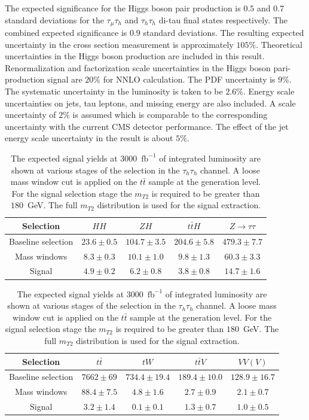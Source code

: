 The expected significance for the Higgs boson pair production is $0.5$ and $0.7$ standard deviations for the $\tau_{\mu}\tau_{h}$ and $\tau_{h}\tau_{h}$ di-tau final states respectively. The combined expected significance is $0.9$ standard deviations. The resulting expected uncertainty in the cross section measurement is approximately $105\%$. Theoretical uncertainties in the Higgs boson production are
included in this result. Renormalization and factorization scale
uncertainties in the Higgs boson pari-production signal are $20\%$ for NNLO
calculation. The PDF uncertainty is $9\%$. The systematic uncertainty in
the luminosity is taken to be $2.6\%$. Energy scale uncertainties on jets, tau leptons, and missing energy are also included. A scale uncertainty of $2\%$ is assumed which is comparable to the corresponding uncertainty with the current CMS detector performance. The effect of the jet energy scale uncertainty in the result is about $5\%$.       

\begin{table}[!ht]
\begin{center} 
\begin{tabular}{|c|c|c|c|c|}
\hline
Selection  & $HH$ & $ZH$ & $t\bar{t}H$ & $Z\rightarrow \tau\tau$  \\  \hline
Baseline selection & $23.6\pm0.5$ & $104.7\pm3.5$ & $204.6\pm5.8$ & $479.3\pm7.7$  \\
Mass windows  & $8.3\pm0.3$ & $10.1\pm1.0$ & $9.8\pm1.3$ & $60.3\pm3.3$ \\ 
Signal  & $4.9\pm0.2$ & $6.2\pm0.8$ &  $3.8\pm0.8$ & $14.7\pm1.6$ \\ \hline
\end{tabular}

\vspace{2mm}

\begin{tabular}{|c|c|c|c|c|}
\hline
Selection   & $t\bar{t}$ & $tW$ & $t\bar{t}V$ & $VV(V)$  \\  \hline
Baseline selection & $7662\pm69$ & $734.4\pm19.4$ & $189.4\pm10.0$ & $128.9\pm16.7$  \\
Mass windows  & $88.4\pm7.5$ & $4.8\pm1.6$ & $2.7\pm0.9$ & $2.1\pm0.7$ \\ 
Signal  & $3.2\pm1.4$ & $0.1\pm0.1$ & $1.3\pm0.7$ & $1.0\pm0.5$ \\ \hline
\end{tabular}

\caption{ The expected signal yields at $3000$~$\mathrm{fb}^{-1}$ of integrated luminosity are shown at various stages of the  selection in the $\tau_{h}\tau_{h}$ channel. A loose mass window cut is applied on the $t\bar{t}$ sample at the  generation level. For the signal selection stage the $m_{T2}$ is required to be greater than $180$~GeV. The full $m_{T2}$ distribution is used for the signal extraction.}
\label{tab:hhsig}
\end{center}
\end{table}



